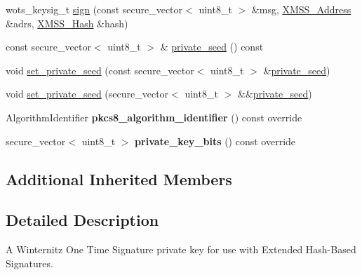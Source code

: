\begin{DoxyCompactItemize}
\item 
wots\+\_\+keysig\+\_\+t \mbox{\hyperlink{class_botan_1_1_x_m_s_s___w_o_t_s___private_key_a035d5d63b7042ebf1709e9c898956e96}{sign}} (const secure\+\_\+vector$<$ uint8\+\_\+t $>$ \&msg, \mbox{\hyperlink{class_botan_1_1_x_m_s_s___address}{X\+M\+S\+S\+\_\+\+Address}} \&adrs, \mbox{\hyperlink{class_botan_1_1_x_m_s_s___hash}{X\+M\+S\+S\+\_\+\+Hash}} \&hash)
\item 
const secure\+\_\+vector$<$ uint8\+\_\+t $>$ \& \mbox{\hyperlink{class_botan_1_1_x_m_s_s___w_o_t_s___private_key_a401b9dde3140edf386dba700b880b265}{private\+\_\+seed}} () const
\item 
void \mbox{\hyperlink{class_botan_1_1_x_m_s_s___w_o_t_s___private_key_abd67c12003a5600b9aaed25b91a96fa5}{set\+\_\+private\+\_\+seed}} (const secure\+\_\+vector$<$ uint8\+\_\+t $>$ \&\mbox{\hyperlink{class_botan_1_1_x_m_s_s___w_o_t_s___private_key_a401b9dde3140edf386dba700b880b265}{private\+\_\+seed}})
\item 
void \mbox{\hyperlink{class_botan_1_1_x_m_s_s___w_o_t_s___private_key_a497d20e641d7234d56657e52d307026b}{set\+\_\+private\+\_\+seed}} (secure\+\_\+vector$<$ uint8\+\_\+t $>$ \&\&\mbox{\hyperlink{class_botan_1_1_x_m_s_s___w_o_t_s___private_key_a401b9dde3140edf386dba700b880b265}{private\+\_\+seed}})
\item 
\mbox{\label{class_botan_1_1_x_m_s_s___w_o_t_s___private_key_ab1196093bad75d74ad7dcfce348443a1}} 
Algorithm\+Identifier {\bfseries pkcs8\+\_\+algorithm\+\_\+identifier} () const override
\item 
\mbox{\label{class_botan_1_1_x_m_s_s___w_o_t_s___private_key_ae661f3ead31edfa4a9c1de6975da29d2}} 
secure\+\_\+vector$<$ uint8\+\_\+t $>$ {\bfseries private\+\_\+key\+\_\+bits} () const override
\end{DoxyCompactItemize}
\subsection*{Additional Inherited Members}


\subsection{Detailed Description}
A Winternitz One Time Signature private key for use with Extended Hash-\/\+Based Signatures. 

